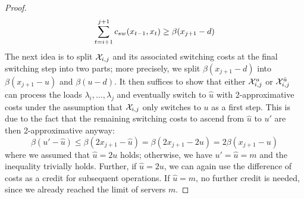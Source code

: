 \begin{proof}
\begin{equation*}
	\sum\limits_{t=i+1}^{j+1}c_{sw}(x_{t-1},x_t)\ge\beta(x_{j+1}-d)
\end{equation*}
The next idea is to split $\mathcal{X}_{i,j}$ and its associated switching costs at the final switching step into two parts; more precisely, we split $\beta(x_{j+1}-d)$ into $\beta(x_{j+1}-u)$ and $\beta(u-d)$. It then suffices to show that either $\mathcal{X}_{i,j}^u$ or $\mathcal{X}_{i,j}^{\hat{u}}$ can process the loads $\lambda_i,\dotsc,\lambda_j$ and eventually switch to $\hat{u}$ with 2-approximative costs under the assumption that $\mathcal{X}_{i,j}$ only switches to $u$ as a first step. This is due to the fact that the remaining switching costs to ascend from $\hat{u}$ to $u'$ are then 2-approximative anyway:
\begin{equation*}
	\beta(u'-\hat{u})\le\beta(2x_{j+1}-\hat{u})=\beta(2x_{j+1}-2u)=2\beta(x_{j+1}-u)
\end{equation*}
where we assumed that $\hat{u}=2u$ holds; otherwise, we have $u'=\hat{u}=m$ and the inequality trivially holds. Further, if $\hat{u}=2u$, we can again use the difference of costs  as a credit for subsequent operations. If $\hat{u}=m$, no further credit is needed, since we already reached the limit of servers $m$.


\end{proof}
